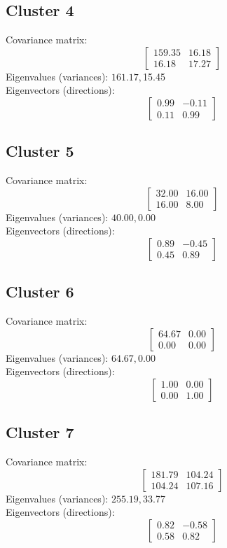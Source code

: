 \documentclass{article}
\begin{document}
\subsection*{Cluster 4}
Covariance matrix:
\[\begin{bmatrix}159.35 & 16.18 \\16.18 & 17.27\end{bmatrix}\]
Eigenvalues (variances): $ 161.17, $15.45\\
Eigenvectors (directions):
\[\begin{bmatrix}0.99 & -0.11 \\0.11 & 0.99\end{bmatrix}\]
\subsection*{Cluster 5}
Covariance matrix:
\[\begin{bmatrix}32.00 & 16.00 \\16.00 & 8.00\end{bmatrix}\]
Eigenvalues (variances): $ 40.00, $0.00\\
Eigenvectors (directions):
\[\begin{bmatrix}0.89 & -0.45 \\0.45 & 0.89\end{bmatrix}\]
\subsection*{Cluster 6}
Covariance matrix:
\[\begin{bmatrix}64.67 & 0.00 \\0.00 & 0.00\end{bmatrix}\]
Eigenvalues (variances): $ 64.67, $0.00\\
Eigenvectors (directions):
\[\begin{bmatrix}1.00 & 0.00 \\0.00 & 1.00\end{bmatrix}\]
\subsection*{Cluster 7}
Covariance matrix:
\[\begin{bmatrix}181.79 & 104.24 \\104.24 & 107.16\end{bmatrix}\]
Eigenvalues (variances): $ 255.19, $33.77\\
Eigenvectors (directions):
\[\begin{bmatrix}0.82 & -0.58 \\0.58 & 0.82\end{bmatrix}\]
\end{document}
